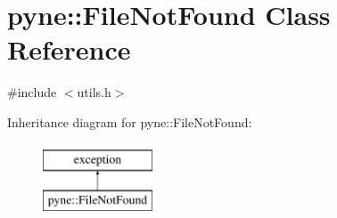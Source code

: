 \hypertarget{classpyne_1_1_file_not_found}{\section{pyne\+:\+:File\+Not\+Found Class Reference}
\label{classpyne_1_1_file_not_found}
}


{\ttfamily \#include $<$utils.\+h$>$}

Inheritance diagram for pyne\+:\+:File\+Not\+Found\+:\begin{figure}[H]
\begin{center}
\leavevmode
\includegraphics[height=2.000000cm]{classpyne_1_1_file_not_found}
\end{center}
\end{figure}
